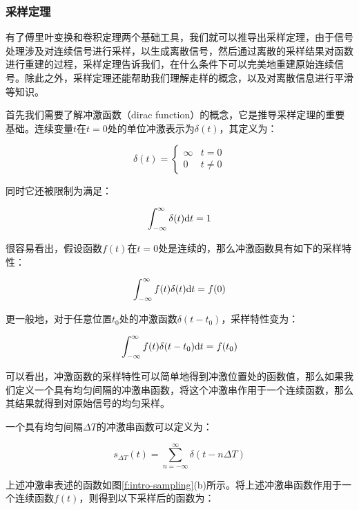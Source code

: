 \subsubsection{采样定理}
有了傅里叶变换和卷积定理两个基础工具，我们就可以推导出采样定理，由于信号处理涉及对连续信号进行采样，以生成离散信号，然后通过离散的采样结果对函数进行重建的过程，采样定理告诉我们，在什么条件下可以完美地重建原始连续信号。除此之外，采样定理还能帮助我们理解走样的概念，以及对离散信息进行平滑等知识。

首先我们需要了解冲激函数（dirac function）的概念，它是推导采样定理的重要基础。连续变量$t$在$t=0$处的单位冲激表示为$\delta(t)$，其定义为：

\begin{equation}
	\delta(t)=\begin{cases}
		\infty & t=0\\
		0      & t\neq 0
	\end{cases}
\end{equation}

\noindent 同时它还被限制为满足：

\begin{equation}
	\int^{\infty}_{-\infty}\delta(t){\rm d}t=1
\end{equation}

很容易看出，假设函数$f(t)$在$t=0$处是连续的，那么冲激函数具有如下的采样特性：

\begin{equation}
	\int^{\infty}_{-\infty}f(t)\delta(t){\rm d}t=f(0)
\end{equation}

更一般地，对于任意位置$t_0$处的冲激函数$\delta(t-t_0)$，采样特性变为：

\begin{equation}
	\int^{\infty}_{-\infty}f(t)\delta(t-t_0){\rm d}t=f(t_0)
\end{equation}

可以看出，冲激函数的采样特性可以简单地得到冲激位置处的函数值，那么如果我们定义一个具有均匀间隔的冲激串函数，将这个冲激串作用于一个连续函数，那么其结果就得到对原始信号的均匀采样。

一个具有均匀间隔$\Delta T$的冲激串函数可以定义为：

\begin{equation}
	s_{\Delta T}(t)=\sum^{\infty}_{n=-\infty}\delta(t-n\Delta T)
\end{equation}

上述冲激串表述的函数如图\ref{f:intro-sampling}(b)所示。将上述冲激串函数作用于一个连续函数$f(t)$，则得到以下采样后的函数为：

